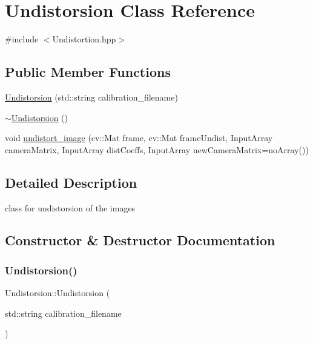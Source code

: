 \hypertarget{class_undistorsion}{}\section{Undistorsion Class Reference}
\label{class_undistorsion}


{\ttfamily \#include $<$Undistortion.\+hpp$>$}

\subsection*{Public Member Functions}
\begin{DoxyCompactItemize}
\item 
\mbox{\hyperlink{class_undistorsion_a447aceee5716c408a3ed662111525cf9}{Undistorsion}} (std\+::string calibration\+\_\+filename)
\item 
\mbox{\hyperlink{class_undistorsion_adc5adf65c7ee3f5668bafd8eeaf31eb4}{$\sim$\+Undistorsion}} ()
\item 
void \mbox{\hyperlink{class_undistorsion_a00c36a6d87702b119e87ca0ff003c92f}{undistort\+\_\+image}} (cv\+::\+Mat frame, cv\+::\+Mat frame\+Undist, Input\+Array camera\+Matrix, Input\+Array dist\+Coeffs, Input\+Array new\+Camera\+Matrix=no\+Array())
\end{DoxyCompactItemize}


\subsection{Detailed Description}
class for undistorsion of the images 

\subsection{Constructor \& Destructor Documentation}
\mbox{\label{class_undistorsion_a447aceee5716c408a3ed662111525cf9}} 
\subsubsection{\texorpdfstring{Undistorsion()}{Undistorsion()}}
{\footnotesize\ttfamily Undistorsion\+::\+Undistorsion (\begin{DoxyParamCaption}\item[{std\+::string}]{calibration\+\_\+filename }\end{DoxyParamCaption})}

